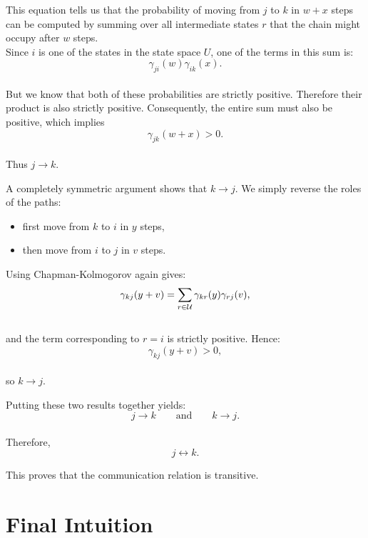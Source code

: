 \documentclass[12pt]{article}
\begin{document}
This equation tells us that the probability of moving from $j$ to $k$ in $w+x$ steps can be computed by summing over all intermediate states $r$ that the chain might occupy after $w$ steps.\\

Since $i$ is one of the states in the state space $U$, one of the terms in this sum is:\\
\[
\gamma_{ji}(w)\gamma_{ik}(x).
\]\\

But we know that both of these probabilities are strictly positive. Therefore their product is also strictly positive. Consequently, the entire sum must also be positive, which implies\\
\[
\gamma_{jk}(w+x)>0.
\]\\

Thus $j \to k$.\\

\vspace{0.3cm}

A completely symmetric argument shows that $k \to j$. We simply reverse the roles of the paths:\\

\begin{itemize}
\item first move from $k$ to $i$ in $y$ steps,
\item then move from $i$ to $j$ in $v$ steps.
\end{itemize}

Using Chapman-Kolmogorov again gives: \\
\[
\gamma_{kj}(y+v)
=
\sum_{r\in \cal{U}}\gamma_{kr}(y)\gamma_{rj}(v),
\]\\
and the term corresponding to $r=i$ is strictly positive. Hence: \\
\[
\gamma_{kj}(y+v)>0,
\]\\
so $k \to j$.\\

\vspace{0.3cm}

Putting these two results together yields: \\
\[
j \to k
\qquad \text{and} \qquad
k \to j.
\]\\

Therefore,\\
\[
j \leftrightarrow k.
\]

This proves that the communication relation is transitive.

\section*{Final Intuition}
\end{document}
